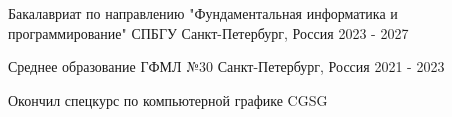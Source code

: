 

\begin{cventries}

  \cventry
    {Бакалавриат по направлению "Фундаментальная информатика и программирование"} %
    {СПБГУ} %
    {Санкт-Петербург, Россия} %
    {2023 - 2027} %
    {
    }

  \cventry
    {Среднее образование} %
    {ГФМЛ №30} %
    {Санкт-Петербург, Россия} %
    {2021 - 2023} %
    {
      \begin{cvitems} %
        \item {Окончил спецкурс по компьютерной графике CGSG}
      \end{cvitems}
    }

\end{cventries}
